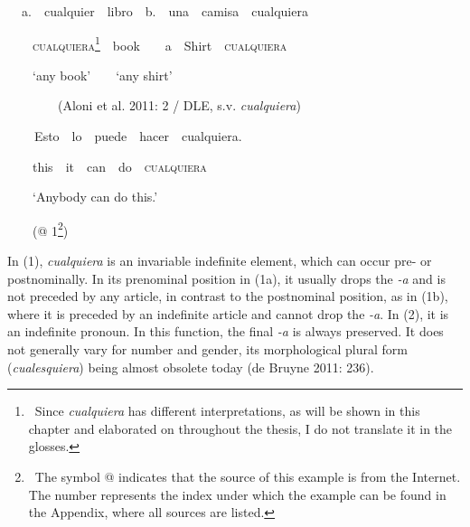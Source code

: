 \begin{styleStandard}
\textbf{\ \ }a.\ \ cualquier\ \ libro\ \ b.\ \ una\ \ camisa\ \ cualquiera
\end{styleStandard}

\begin{styleStandard}
\ \ \ \ \textsc{cualquiera}\textstyleFootnoteSymbol{ }\footnote{\textrm{\ Since }\textrm{\textit{cualquiera}}\textrm{ has different interpretations, as will be shown in this chapter and elaborated on throughout the thesis, I do not translate it in the glosses.}}\ \ book\ \ \ \ a\ \ Shirt\ \  \textsc{cualquiera}
\end{styleStandard}

\begin{styleStandard}
\ \ \ \ ‘any book’\ \ \ \ ‘any shirt’
\end{styleStandard}

\begin{styleStandard}
\ \ \ \ \ \ \ \  (Aloni et al. 2011: 2 / DLE, s.v. \textit{cualquiera})
\end{styleStandard}

\begin{styleStandard}
\textbf{\ \ }\ \ Esto\ \ lo\ \ puede\ \ hacer\ \ cualquiera.\ \ 
\end{styleStandard}

\begin{styleStandard}
\ \ \ \ this\ \ it\ \ can\ \ do\ \ \textsc{cualquiera}\ \ 
\end{styleStandard}

\begin{styleStandard}
\ \ \ \ ‘Anybody can do this.’
\end{styleStandard}

\begin{styleStandard}
\ \ \ \ (@ 1\footnote{\textrm{\ The symbol @ indicates that the source of this example is from the Internet. The number represents the index under which the example can be found in the Appendix, where all sources are listed.}})
\end{styleStandard}

\begin{styleStandard}
In (1), \textit{cualquiera} is an invariable indefinite element, which can occur pre- or postnominally. In its prenominal position in (1a), it usually drops the \textit{{}-a }and is not preceded by any article, in contrast to the postnominal position, as in (1b), where it is preceded by an indefinite article and cannot drop the \textit{{}-a}. In (2), it is an indefinite pronoun. In this function, the final \textit{{}-a} is always preserved. It does not generally vary for number and gender, its morphological plural form (\textit{cualesquiera}) being almost obsolete today (de Bruyne 2011: 236).
\end{styleStandard}

